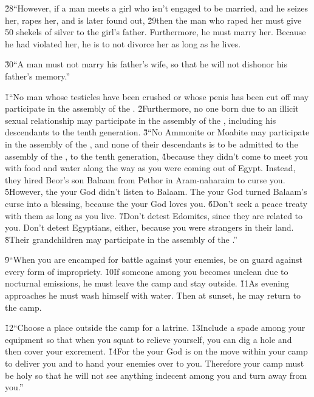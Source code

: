 \v{28}``However, if a man meets a girl who isn't engaged to be married, and he seizes her, rapes her, and is later found out, \v{29}then the man who raped her must give 50 shekels of silver to the girl's father. Furthermore, he must marry her. Because he had violated her, he is to not divorce her as long as he lives.

\v{30}``A man must not marry his father's wife, so that he will not dishonor his father's memory.''

\v{1}``No man whose testicles have been crushed or whose penis has been cut off may participate in the assembly of the . \v{2}Furthermore, no one born due to an illicit sexual relationship may participate in the assembly of the , including his descendants to the tenth generation. \v{3}``No Ammonite or Moabite may participate in the assembly of the , and none of their descendants is to be admitted to the assembly of the , to the tenth generation, \v{4}because they didn't come to meet you with food and water along the way as you were coming out of Egypt. Instead, they hired Beor's son Balaam from Pethor in Aram-naharaim to curse you. \v{5}However, the  your God didn't listen to Balaam. The  your God turned Balaam's curse into a blessing, because the  your God loves you. \v{6}Don't seek a peace treaty with them as long as you live. \v{7}Don't detest Edomites, since they are related to you. Don't detest Egyptians, either, because you were strangers in their land. \v{8}Their grandchildren may participate in the assembly of the .''

\v{9}``When you are encamped for battle against your enemies, be on guard against every form of impropriety. \v{10}If someone among you becomes unclean due to nocturnal emissions, he must leave the camp and stay outside. \v{11}As evening approaches he must wash himself with water. Then at sunset, he may return to the camp.

\v{12}``Choose a place outside the camp for a latrine. \v{13}Include a spade among your equipment so that when you squat to relieve yourself, you can dig a hole and then cover your excrement. \v{14}For the  your God is on the move within your camp to deliver you and to hand your enemies over to you. Therefore your camp must be holy so that he will not see anything indecent among you and turn away from you.''

